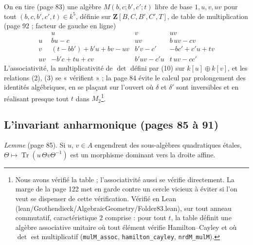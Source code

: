 \documentclass[11pt,a4paper]{article}
\begin{document}
On en tire (page 83) une algèbre $M(b, c; b', c'; t)$ libre de base $1, u, v,
uv$ pour tout $(b, c, b', c', t) \in k^5$, définie sur
$\mathbf{Z}[B, C, B', C', T]$, de table de multiplication (page 92 ; facteur de
gauche en ligne)
\[
  \begin{array}{c|ccc}
    & u & v & uv \\ \hline
    u & bu - c & uv & b\,uv - cv \\
    v & (t - bb') + b'u + bv - uv & b'v - c' & -bc' + c'u + tv \\
    uv & -b'c + tu + cv & b'uv - c'u & t\,uv - cc'
  \end{array}
\]
L'associativité, la multiplicativité de $\det$ défini par (10) sur $k[u]
\oplus k[v]$, et les relations (2), (3) se « vérifient » ; la page 84 évite le
calcul par prolongement des identités algébriques, en se plaçant sur l'ouvert
où $\delta$ et $\delta'$ sont inversibles et en réalisant presque tout $t$
dans $M_2$\footnote{Nous avons vérifié la table ; l'associativité aussi se
vérifie directement. La marge de la page 122 met en garde contre un cercle
vicieux à éviter si l'on veut se dispenser de cette vérification. Vérifié en
Lean (lean/Grothendieck/AlgebraicGeometry/Folder83.lean), sur tout anneau commutatif,
caractéristique $2$ comprise : pour tout $t$, la table définit une algèbre
associative unitaire où tout élément vérifie Hamilton--Cayley et où $\det$ est
multiplicatif (\texttt{mulM\_assoc}, \texttt{hamilton\_cayley},
\texttt{nrdM\_mulM}).}.

\subsection*{L'invariant anharmonique (pages 85 à 91)}

\emph{Lemme} (page 85). Si $u$, $v \in A$ engendrent des sous-algèbres
quadratiques étales, $\Theta \mapsto \operatorname{Tr}(u\,\Theta v\Theta^{-1})$
est un morphisme dominant vers la droite affine.
\end{document}
